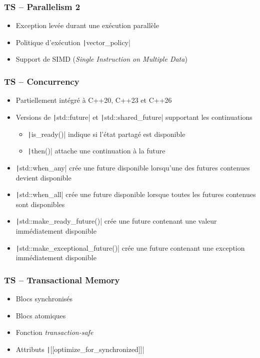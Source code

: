 \documentclass[C++.tex]{subfiles}
\begin{document}
\begin{frame}[fragile]
	\frametitle{TS -- Parallelism 2}
	\begin{itemize}
		\item Exception levée durant une exécution parallèle
		\item Politique d'exécution \texttt|vector_policy|
		\item Support de SIMD (\textit{Single Instruction on Multiple Data})
	\end{itemize}
\end{frame}

\begin{frame}[fragile]
	\frametitle{TS -- Concurrency}
	\begin{itemize}
		\item Partiellement intégré à C++20, C++23 et C++26
		\item Versions de \texttt|std::future| et \texttt|std::shared_future| supportant les continuations
		\begin{itemize}
			\item \texttt|is_ready()| indique si l'état partagé est disponible
			\item \texttt|then()| attache une continuation à la future
		\end{itemize}
		\item \texttt|std::when_any| crée une future disponible lorsqu'une des futures contenues devient disponible
		\item \texttt|std::when_all| crée une future disponible lorsque toutes les futures contenues sont disponibles
		\item \texttt|std::make_ready_future()| crée une future contenant une valeur immédiatement disponible
		\item \texttt|std::make_exceptional_future()| crée une future contenant une exception immédiatement disponible
	\end{itemize}
\end{frame}

\begin{frame}[fragile]
	\frametitle{TS -- Transactional Memory}
	\begin{itemize}
		\item Blocs synchronisés
		\item Blocs atomiques
		\item Fonction \textit{transaction-safe}
		\item Attributs \texttt|[[optimize_for_synchronized]]|
	\end{itemize}
\end{frame}
\end{document}
